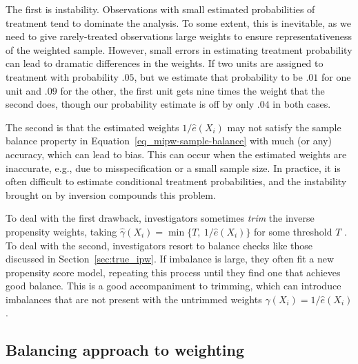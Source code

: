 \documentclass{article}
\theoremstyle{definition}
\newcommand{\hgammaipw}{\ensuremath{\hat\gamma}}
\newcommand{\<}{\langle}
\renewcommand{\>}{\rangle}
\begin{document}
The first is instability. Observations with small estimated probabilities of treatment tend to dominate the analysis. To some extent, this is inevitable, as we need to give rarely-treated observations large weights to ensure representativeness of the weighted sample. However, small errors in estimating treatment probability can lead to dramatic differences in the weights. If two units are assigned to treatment with probability $.05$, but we estimate that probability to be  $.01$ for one unit and $.09$ for the other, the first unit gets nine times the weight that the second does, though our probability estimate is off by only $.04$ in both cases.

The second is that the estimated weights $1 / \hat{e}(X_i)$ may not satisfy the sample balance property in Equation~\ref{eq_mipw-sample-balance}
with much (or any) accuracy, which can lead to bias. This can occur when the estimated weights are inaccurate, e.g., due to misspecification or a small sample size. In practice, it is often difficult to estimate conditional treatment probabilities, and the instability brought on by inversion compounds this problem.%

To deal with the first drawback, investigators sometimes \emph{trim} the inverse propensity weights,
taking $\hgammaipw(X_i)=\min\{ T, \ 1/\hat e(X_i) \}$ for some threshold $T$ \citep{crump2009dealing}. To deal with the second, investigators resort to balance checks like those discussed in Section~\ref{sec:true_ipw}. If imbalance is large, they often fit a new propensity score model, repeating this process until they find one that achieves good balance. This is a good
accompaniment to trimming, which can introduce imbalances that are not present with the untrimmed weights $\hgammaipw(X_i)=1/\hat e(X_i)$.


\vspace{-.3cm}
\subsection{Balancing approach to weighting}
\label{sec:bal_weights_intro}
\end{document}
